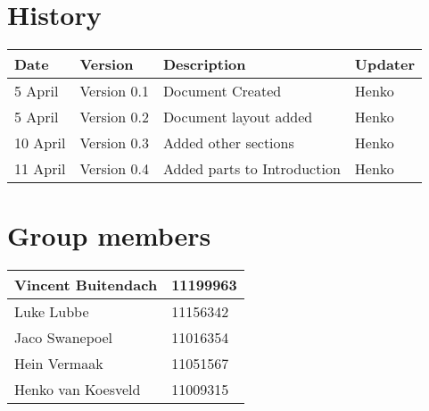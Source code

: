 
\section{History}

\begin{center}

\begin{tabular}{|l|l|l|l|}

\hline
Date & Version & Description&Updater\\ 
\hline
5 April& Version 0.1 & Document Created&Henko\\ 
\hline
5 April& Version 0.2 & Document layout added&Henko\\ 
\hline
10 April & Version 0.3 & Added other sections&Henko\\ 
\hline
11 April & Version 0.4 & Added parts to Introduction&Henko\\ %
\hline

\end{tabular}

\vfill
\section{Group members}

\begin{tabular}{|l|l|}

\hline
Vincent Buitendach & 11199963\\
\hline
Luke Lubbe & 11156342\\
\hline
Jaco Swanepoel & 11016354\\
\hline
Hein Vermaak & 11051567\\
\hline
Henko van Koesveld & 11009315\\
\hline

\end{tabular}

\end{center}

